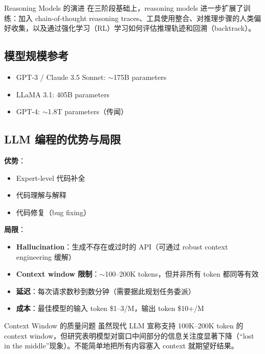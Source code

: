 \documentclass[a4paper]{article}
\begin{document}
\begin{importantbox}{Reasoning Models 的演进}
在三阶段基础上，reasoning models 进一步扩展了训练：加入 chain-of-thought reasoning traces、工具使用整合、对推理步骤的人类偏好收集，以及通过强化学习（RL）学习如何评估推理轨迹和回溯（backtrack）。
\end{importantbox}

\subsection{模型规模参考}

\begin{itemize}
    \item GPT-3 / Claude 3.5 Sonnet: $\sim$175B parameters
    \item LLaMA 3.1: 405B parameters
    \item GPT-4: $\sim$1.8T parameters（传闻）
\end{itemize}

\subsection{LLM 编程的优势与局限}

\textbf{优势}：
\begin{itemize}
    \item Expert-level 代码补全
    \item 代码理解与解释
    \item 代码修复（bug fixing）
\end{itemize}

\textbf{局限}：
\begin{itemize}
    \item \textbf{Hallucination}：生成不存在或过时的 API（可通过 robust context engineering 缓解）
    \item \textbf{Context window 限制}：$\sim$100--200K tokens，但并非所有 token 都同等有效
    \item \textbf{延迟}：每次请求数秒到数分钟（需要据此规划任务委派）
    \item \textbf{成本}：最佳模型的输入 token \$1--3/M，输出 token \$10+/M
\end{itemize}

\begin{warningbox}{Context Window 的质量问题}
虽然现代 LLM 宣称支持 100K--200K token 的 context window，但研究表明模型对窗口中间部分的信息关注度显著下降（``lost in the middle''现象）。不能简单地把所有内容塞入 context 就期望好结果。
\end{warningbox}
\end{document}
